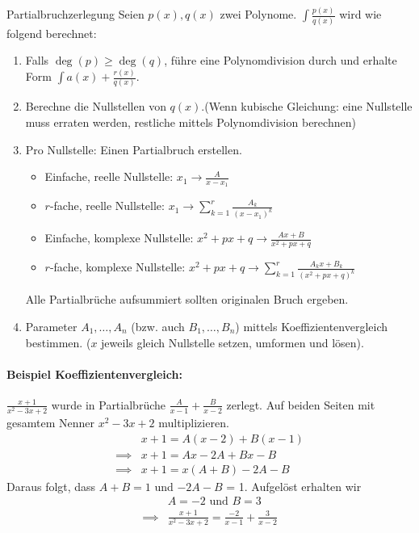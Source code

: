 \documentclass[a4paper,10pt]{article}
\begin{document}
\begin{mainbox}{Partialbruchzerlegung}
 Seien $p(x), q(x)$ zwei Polynome. $\int \frac{p(x)}{q(x)}$ wird wie folgend berechnet:
 \begin{enumerate}
  \item Falls $\deg(p) \ge \deg(q)$, führe eine Polynomdivision durch und erhalte Form $\int a(x) + \frac{r(x)}{q(x)}$.
  \item Berechne die Nullstellen von $q(x)$.(Wenn kubische Gleichung: eine Nullstelle muss erraten werden, restliche mittels Polynomdivision berechnen)
  \item Pro Nullstelle: Einen Partialbruch erstellen.
  \begin{itemize}[left=0pt]
   \item Einfache, reelle Nullstelle: $x_1 \to \frac{A}{x - x_1}$
   \item $r$-fache, reelle Nullstelle: $x_1 \to \sum_{k=1}^r \frac{A_k}{(x-x_1)^k}$ 
   \item Einfache, komplexe Nullstelle: $x^2 + px + q \to \frac{Ax + B} {x^2 + px + q}$
   \item $r$-fache, komplexe Nullstelle: $x^2 + px + q \to \sum_{k=1}^r \frac{A_k x + B_k}{(x^2 + px + q)^k}$
  \end{itemize}
  Alle Partialbrüche aufsummiert sollten originalen Bruch ergeben.
  \item Parameter $A_1, \ldots, A_n$ (bzw. auch $B_1, \ldots, B_n$) mittels Koeffizientenvergleich bestimmen. ($x$ jeweils gleich Nullstelle setzen, umformen und lösen).
 \end{enumerate}
\end{mainbox}
\paragraph{Beispiel Koeffizientenvergleich:} $\frac{x + 1}{x^2 - 3x + 2}$ wurde in Partialbrüche $\frac{A}{x - 1} + \frac{B}{x - 2}$ zerlegt. Auf beiden Seiten mit gesamtem Nenner $x^2 - 3x + 2$ multiplizieren.
\begin{align*}
    &x + 1 = A(x - 2) + B(x - 1) \\
    \implies &x + 1 = Ax - 2A + Bx - B \\
    \implies &x + 1 = x(A + B) - 2A - B
\end{align*}
Daraus folgt, dass $A + B = 1$ und $-2A - B$ = 1. Aufgelöst erhalten wir
\begin{align*}
    &A = -2 \text{ und } B = 3 \\
    \implies &\frac{x + 1}{x^2 - 3x + 2} = \frac{-2}{x - 1} + \frac{3}{x - 2}
\end{align*}
\end{document}
